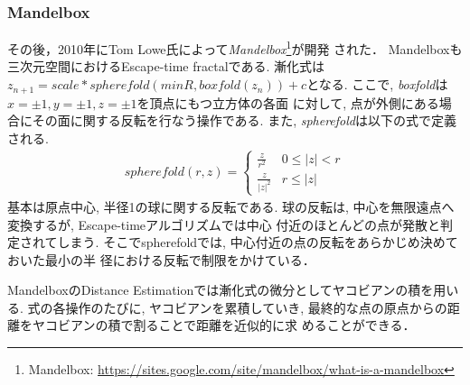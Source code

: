 \subsubsection{Mandelbox}
その後，2010年にTom Lowe氏によって{\it Mandelbox}\footnote{Mandelbox:
\url{https://sites.google.com/site/mandelbox/what-is-a-mandelbox}}が開発
された．
Mandelboxも三次元空間におけるEscape-time fractalである.
漸化式は$z_{n+1} = scale * spherefold(minR, boxfold(z_n)) + c$となる.
ここで, {\it boxfold}は$x=\pm1, y=\pm1, z=\pm1$を頂点にもつ立方体の各面
に対して, 点が外側にある場合にその面に関する反転を行なう操作である.
また, {\it spherefold}は以下の式で定義される.
\begin{eqnarray*}
 spherefold(r, z) = \begin{cases}
                  \frac{z}{r^2} & 0 \le |z| < r \\
                  \frac{z}{|z|^2} & r \le |z|
                 \end{cases}
\end{eqnarray*}
基本は原点中心, 半径1の球に関する反転である.
球の反転は, 中心を無限遠点へ変換するが, Escape-timeアルゴリズムでは中心
付近のほとんどの点が発散と判定されてしまう.
そこでspherefoldでは, 中心付近の点の反転をあらかじめ決めておいた最小の半
径における反転で制限をかけている．

MandelboxのDistance Estimationでは漸化式の微分としてヤコビアンの積を用いる.
式の各操作のたびに, ヤコビアンを累積していき,
最終的な点の原点からの距離をヤコビアンの積で割ることで距離を近似的に求
めることができる．

